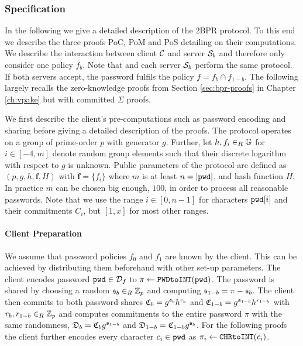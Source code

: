 \subsubsection{Specification}\label{sec:protocol}
In the following we give a detailed description of the \ac{2BPR} protocol.
To this end we describe the three proofs \ac{PoC}, \ac{PoM} and \ac{PoS} detailing on their computations.
We describe the interaction between client $\mathcal{C}$ and server $\mathcal{S}_b$ and therefore only consider one policy $f_b$.
Note that \Client and each server $\mathcal{S}_b$ perform the same protocol.
If both servers accept, the password fulfils the policy $f=f_b\cap f_{1-b}$.
The following largely recalls the zero-knowledge proofs from Section \ref{sec:bpr-proofs} in Chapter \ref{ch:vpake} but with committed $\Sigma$ proofs.

We first describe the client's pre-computations such as password encoding and sharing before giving a detailed description of the proofs.
The protocol operates on a group \GG of prime-order $p$ with generator $g$.
Further, let $h,f_i\in_R \mathbb{G}$ for $i\in[-4,m]$ denote random group elements such that their discrete logarithm with respect to $g$ is unknown.
Public parameters of the protocol are defined as $(p,g,h,\bm f, H)$ with $\bm f = \{f_i\}$ where $m$ is at least $n=|\mathtt{pwd}|$, and hash function $H$.
In practice $m$ can be chosen big enough, \eg $100$, in order to process all reasonable passwords.
Note that we use the range $i\in[0,n-1]$ for characters $\mathtt{pwd}[i]$ and their commitments $C_i$, but $[1,x]$ for most other ranges.

\paragraph{Client Preparation}
We assume that password policies $f_0$ and $f_1$ are known by the client.
This can be achieved by distributing them beforehand with other set-up parameters.
The client encodes password $\mathtt{pwd}\in\mathcal{D}_f$ to $\pi\gets\texttt{PWDtoINT}(\mathtt{pwd})$.
The password is shared by choosing a random $\mathfrak{s}_{b}\in_R\mathbb{Z}_p$ and computing $\mathfrak{s}_{1-b}=\pi-\mathfrak{s}_{b}$.
The client then commits to both password shares $\mathfrak{C}_b=g^{\mathfrak{s}_{b}}h^{r_b}$ and $\mathfrak{C}_{1-b}=g^{\mathfrak{s}_{1-b}}h^{r_{1-b}}$ with $r_b,r_{1-b}\in_R\mathbb{Z}_p$ and computes commitments to the entire password $\pi$ with the same randomness, \ie $\mathfrak{D}_b=\mathfrak{C}_b g^{\mathfrak{s}_{1-b}}$ and $\mathfrak{D}_{1-b}=\mathfrak{C}_{1-b} g^{\mathfrak{s}_{b}}$.
For the following proofs the client further encodes every character $c_i\in\mathtt{pwd}$ as $\pi_i\gets\texttt{CHRtoINT}(c_i)$.

